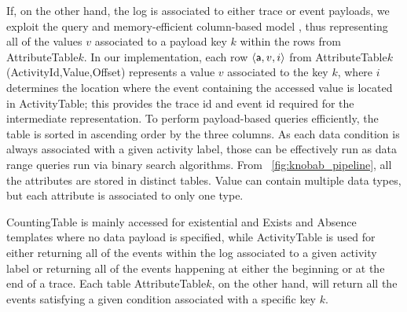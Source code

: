 If, on the other hand, the log is associated to either trace or event payloads, we exploit 
the query and memory-efficient  column-based model \cite{IdreosGNMMK12}, thus representing all of the values $v$ associated to a  payload key $k$ within the rows from  \textsf{AttributeTable$k$}. In our implementation, each row $\braket{\textsf{a},v,i}$ from  \textsf{AttributeTable$k$(ActivityId,Value,Offset)} represents a value $v$ associated to the key $k$, where $i$ determines the location where the event containing the accessed value is located in \textsf{ActivityTable}; this %
provides the trace id and event id required for the intermediate representation.
 To perform payload-based queries efficiently, the table is sorted in ascending order by the  three columns. As each data condition is always associated with a given activity label, those can be effectively run as data range queries run via binary search algorithms. From \figurename~\ref{fig:knobab_pipeline}, all the attributes are stored in distinct tables. \textsf{{Value}} can contain multiple data types, but each attribute is associated to only one type. %


\textsf{CountingTable} is mainly accessed for existential and \textsf{Exists} and \textsf{Absence} templates where no data payload is specified, while  \textsf{ActivityTable} is  used for either returning all of the events within the log associated to a given activity label or returning all of the events happening at either the beginning or at the end of a trace. Each table \textsf{AttributeTable$k$}, on the other hand, will 
return all the events satisfying a given condition associated with a specific %
key $k$. 

